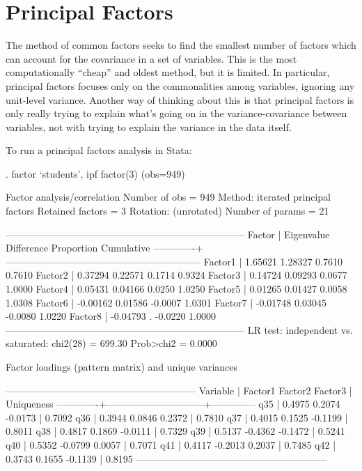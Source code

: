 \documentclass[12pt]{article}
\begin{document}
\section{Principal Factors}

The method of common factors seeks to find the smallest number of
factors which can account for the covariance in a set of
variables. This is the most computationally ``cheap'' and oldest
method, but it is limited. In particular, principal factors focuses
only on the commonalities among variables, ignoring any unit-level
variance. Another way of thinking about this is that principal factors
is only really trying to explain what's going on in the
variance-covariance between variables, not with trying to explain the
variance in the data itself. 

To run a principal factors analysis in Stata:
\begin{stlog}
  . factor `students', ipf factor(3)
(obs=949)

Factor analysis/correlation                        Number of obs    =      949
    Method: iterated principal factors             Retained factors =        3
    Rotation: (unrotated)                          Number of params =       21

    --------------------------------------------------------------------------
         Factor  |   Eigenvalue   Difference        Proportion   Cumulative
    -------------+------------------------------------------------------------
        Factor1  |      1.65621      1.28327            0.7610       0.7610
        Factor2  |      0.37294      0.22571            0.1714       0.9324
        Factor3  |      0.14724      0.09293            0.0677       1.0000
        Factor4  |      0.05431      0.04166            0.0250       1.0250
        Factor5  |      0.01265      0.01427            0.0058       1.0308
        Factor6  |     -0.00162      0.01586           -0.0007       1.0301
        Factor7  |     -0.01748      0.03045           -0.0080       1.0220
        Factor8  |     -0.04793            .           -0.0220       1.0000
    --------------------------------------------------------------------------
    LR test: independent vs. saturated:  chi2(28) =  699.30 Prob>chi2 = 0.0000

Factor loadings (pattern matrix) and unique variances

    -----------------------------------------------------------
        Variable |  Factor1   Factor2   Factor3 |   Uniqueness 
    -------------+------------------------------+--------------
             q35 |   0.4975    0.2074   -0.0173 |      0.7092  
             q36 |   0.3944    0.0846    0.2372 |      0.7810  
             q37 |   0.4015    0.1525   -0.1199 |      0.8011  
             q38 |   0.4817    0.1869   -0.0111 |      0.7329  
             q39 |   0.5137   -0.4362   -0.1472 |      0.5241  
             q40 |   0.5352   -0.0799    0.0057 |      0.7071  
             q41 |   0.4117   -0.2013    0.2037 |      0.7485  
             q42 |   0.3743    0.1655   -0.1139 |      0.8195  
    -----------------------------------------------------------
\end{stlog}
\end{document}
